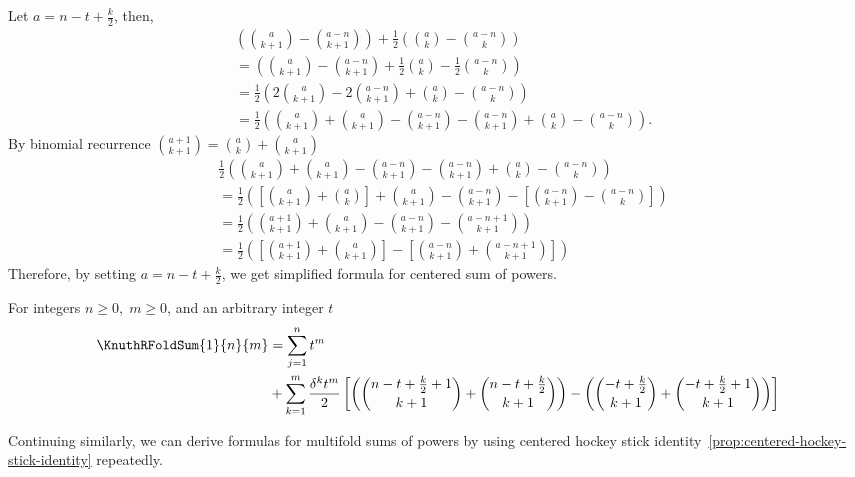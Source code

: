 Let $a=n-t+\frac{k}{2}$, then,
\begin{align*}
  &\left( \binom{a}{k+1} - \binom{a-n}{k+1} \right)
  + \frac{1}{2}
  \left( \binom{a}{k} - \binom{a-n}{k} \right) \\
  &=\left(
    \binom{a}{k+1} - \binom{a-n}{k+1}
    + \frac{1}{2}
    \binom{a}{k} - \frac{1}{2} \binom{a-n}{k}
  \right) \\
  &=\frac{1}{2} \left(
    2 \binom{a}{k+1} -  2 \binom{a-n}{k+1}
    + \binom{a}{k} - \binom{a-n}{k}
  \right) \\
  &=\frac{1}{2} \left(
    \binom{a}{k+1} + \binom{a}{k+1} - \binom{a-n}{k+1} - \binom{a-n}{k+1}
    + \binom{a}{k} - \binom{a-n}{k}
  \right).
\end{align*}
By binomial recurrence $\binom{a+1}{k+1} = \binom{a}{k} + \binom{a}{k+1}$
\begin{align*}
  &\frac{1}{2} \left(
    \binom{a}{k+1} + \binom{a}{k+1} - \binom{a-n}{k+1} - \binom{a-n}{k+1}
    + \binom{a}{k} - \binom{a-n}{k}
  \right) \\
  &= \frac{1}{2} \left(
    \left[ \binom{a}{k+1} + \binom{a}{k} \right]
    + \binom{a}{k+1} - \binom{a-n}{k+1}
    - \left[ \binom{a-n}{k+1} - \binom{a-n}{k} \right]
  \right) \\
  &= \frac{1}{2} \left(
    \binom{a+1}{k+1}
    + \binom{a}{k+1}
    - \binom{a-n}{k+1}
    - \binom{a-n+1}{k+1}
  \right) \\
  &= \frac{1}{2} \left(
    \left[ \binom{a+1}{k+1} + \binom{a}{k+1} \right]
    - \left[ \binom{a-n}{k+1} + \binom{a-n+1}{k+1} \right]
  \right)
\end{align*}
Therefore, by setting $a=n-t+\frac{k}{2}$,
we get simplified formula for centered sum of powers.
\begin{proposition}
  \label{prop:simplified-centered-sums-of-powers}
  For integers $n\geq 0, \; m \geq 0$, and an arbitrary integer $t$
  \begin{align*}
    \KnuthRFoldSum{1}{n}{m}
    &= \sum_{j=1}^{n} t^m \\
    &+ \sum_{k=1}^{m} \frac{\delta^{k} t^m}{2}
    \left[
      \left( \binom{n-t+\frac{k}{2}+1}{k+1} + \binom{n-t+\frac{k}{2}}{k+1} \right)
      -
      \left( \binom{-t+\frac{k}{2}}{k+1} + \binom{-t+\frac{k}{2}+1}{k+1} \right)
    \right]
  \end{align*}
\end{proposition}
Continuing similarly, we can derive formulas
for multifold sums of powers
by using centered hockey stick
identity~\eqref{prop:centered-hockey-stick-identity} repeatedly.
